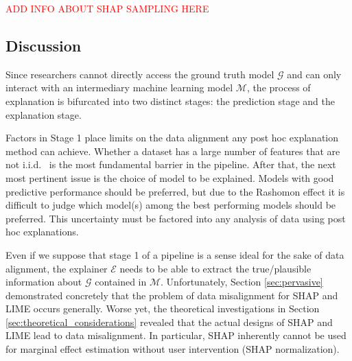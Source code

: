\documentclass[mnsc,blindrev]{informs3}
\begin{document}
        \textcolor{red}{ADD INFO ABOUT SHAP SAMPLING HERE}

    \subsection{Discussion}
            Since researchers cannot directly access the ground truth model $\mathcal{G}$ and can only interact with an intermediary machine learning model $\mathcal{M}$, the process of explanation is bifurcated into two distinct stages: the prediction stage and the explanation stage. 
            
            Factors in Stage 1 place limits on the data alignment any post hoc explanation method can achieve. Whether a dataset has a large number of features that are not i.i.d.~ is the most fundamental barrier in the pipeline. After that, the next most pertinent issue is the choice of model to be explained. Models with good predictive performance should be preferred, but due to the Rashomon effect it is difficult to judge which model(s) among the best performing models should be preferred. This uncertainty must be factored into any analysis of data using post hoc explanations. 
            
            
            Even if we suppose that stage 1 of a pipeline is a sense ideal for the sake of data alignment, the explainer $\mathcal{E}$ needs to be able to extract the true/plausible information about $\mathcal{G}$ contained in $\mathcal{M}$. Unfortunately, Section \ref{sec:pervasive} demonstrated concretely that the problem of data misalignment for SHAP and LIME occurs generally. Worse yet, the theoretical investigations in Section \ref{sec:theoretical_considerations} revealed that the actual designs of SHAP and LIME lead to data misalignment. In particular, SHAP inherently cannot be used for marginal effect estimation without user intervention (SHAP normalization).
            
\end{document}
